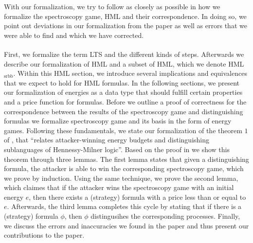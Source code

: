 With our formalization, we try to follow \cite{bisping2023lineartimebranchingtime} as closely as possible in how we formalize the spectroscopy game, HML and their correspondence.
In doing so, we point out deviations in our formalization from the paper as well as errors that we were able to find and which we have corrected.
\\\\
First, we formalize the term LTS and the different kinds of steps.
Afterwards we describe our formalization of HML and a subset of HML, which we denote HML$_\text{srbb}$.
Within this HML section, we introduce several implications and equivalences that we expect to hold for HML formulas.
In the following sections, we present our formalization of energies as a data type that should fulfill certain properties and a price function for formulas.
Before we outline a proof of correctness for the correspondence between the results of the spectroscopy game and distinguishing formulas we formalize spectroscopy game and its basis in the form of energy games.
Following these fundamentals, we state our formalization of the theorem $1$ of \cite{bisping2023lineartimebranchingtime}, that ``relates attacker-winning energy budgets and distinguishing sublanguages of Hennessy-Milner logic''. 
Based on the proof in \cite{bisping2023lineartimebranchingtime} we show this theorem through three lemmas. 
The first lemma states that given a distinguishing formula, the attacker is able to win the corresponding spectroscopy game, which we prove by induction.
Using the same technique, we prove the second lemma, which claimes that if the attacker wins the spectroscopy game with an initial energy $e$, then there exists a (strategy) formula with a price less than or equal to $e$.
Afterwards, the third lemma completes this cycle by stating that if there is a (strategy) formula $\phi$, then $\phi$ distingusihes the corresponding processes.
Finally, we discuss the errors and inaccuracies we found in the paper and thus present our contributions to the paper\cite{bisping2023lineartimebranchingtime}.